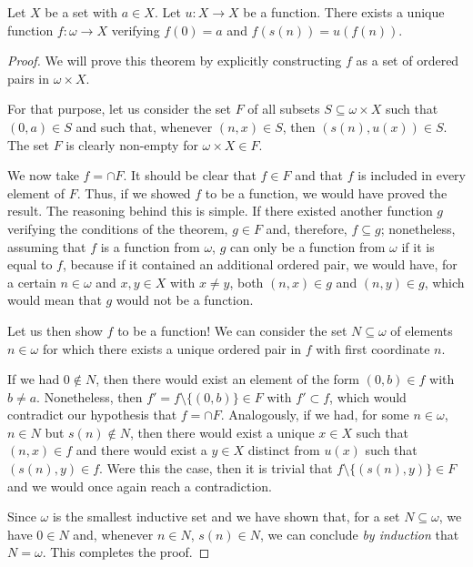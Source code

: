 \begin{theorem}
Let $X$ be a set with $a \in X$. Let $u:X\longrightarrow X$ be a function. There exists a unique function $f:\omega \longrightarrow X$ verifying $f(0) = a$ and $f(s(n)) = u(f(n))$.
\label{<+label+>}
\end{theorem}

\begin{proof}
We will prove this theorem by explicitly constructing $f$ as a set of ordered pairs in $\omega\times X$.

For that purpose, let us consider the set $F$ of all subsets $S\subseteq \omega \times X$ such that $(0,a)\in S$ and such that, whenever $(n,x)\in S$, then $(s(n),u(x)) \in S$.
The set $F$ is clearly non-empty for $\omega \times X\in F$.

We now take $f = \cap F$.
It should be clear that $f\in F$ and that $f$ is included in every element of $F$.
Thus, if we showed $f$ to be a function, we would have proved the result.
The reasoning behind this is simple.
If there existed another function $g$ verifying the conditions of the theorem, $g\in F$ and, therefore, $f\subseteq g$; nonetheless, assuming that $f$ is a function from $\omega$, $g$ can only be a function from $\omega$ if it is equal to $f$, because if it contained an additional ordered pair, we would have, for a certain $n\in \omega$ and $x,y\in X$ with $x\neq y$, both $(n,x)\in g$ and $(n,y)\in g$, which would mean that $g$ would not be a function.

Let us then show $f$ to be a function! We can consider the set $N\subseteq \omega$ of elements $n\in \omega$ for which there exists a unique ordered pair in $f$ with first coordinate $n$.

If we had $0\not\in N$, then there would exist an element of the form $(0,b)\in f$ with $b\neq a$. Nonetheless, then $f' = f\setminus \{(0,b)\}\in F$ with $f'\subset f$, which would contradict our hypothesis that $f = \cap F$.
Analogously, if we had, for some $n\in \omega$, $n\in N$ but $s(n)\not\in N$, then there would exist a unique $x\in X$ such that $(n,x)\in f$ and there would exist a $y \in X$ distinct from $u(x)$ such that $(s(n), y)\in f$.
Were this the case, then it is trivial that $f\setminus \{(s(n),y)\}\in F$ and we would once again reach a contradiction.

Since $\omega$ is the smallest inductive set and we have shown that, for a set $N\subseteq \omega$, we have $0\in N$ and, whenever $n\in N$, $s(n) \in N$, we can conclude \emph{by induction} that $N = \omega$. This completes the proof. 
\end{proof}

